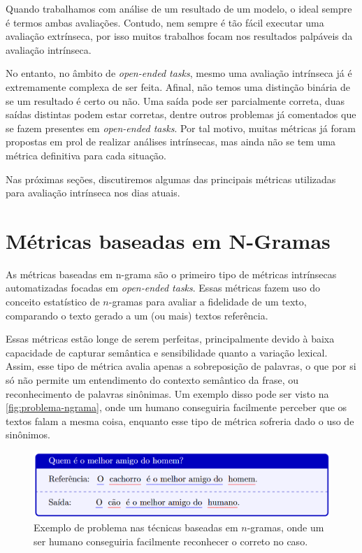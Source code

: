\documentclass[cic,tc]{iiufrgs}
\begin{document}
Quando trabalhamos com análise de um resultado de um modelo, o ideal sempre é termos ambas avaliações. Contudo, nem sempre é tão fácil executar uma avaliação extrínseca, por isso muitos trabalhos focam nos resultados palpáveis da avaliação intrínseca. 

No entanto, no âmbito de \textit{open-ended tasks}, mesmo uma avaliação intrínseca já é extremamente complexa de ser feita. Afinal, não temos uma distinção binária de se um resultado é certo ou não. Uma saída pode ser parcialmente correta, duas saídas distintas podem estar corretas, dentre outros problemas já comentados que se fazem presentes em \textit{open-ended tasks}. Por tal motivo, muitas métricas já foram propostas em prol de realizar análises intrínsecas, mas ainda não se tem uma métrica definitiva para cada situação.

Nas próximas seções, discutiremos algumas das principais métricas utilizadas para avaliação intrínseca nos dias atuais.

\section{Métricas baseadas em N-Gramas}
\label{sec:métricas baseadas em n-gramas}
As métricas baseadas em n-grama são o primeiro tipo de métricas intrínsecas automatizadas focadas em \textit{open-ended tasks}. Essas métricas fazem uso do conceito estatístico de $n$-gramas \cite{shannon1948mathematical} para avaliar a fidelidade de um texto, comparando o texto gerado a um (ou mais) textos referência.

Essas métricas estão longe de serem perfeitas, principalmente devido à baixa capacidade de capturar semântica e sensibilidade quanto a variação lexical. Assim, esse tipo de métrica avalia apenas a sobreposição de palavras, o que por si só não permite um entendimento do contexto semântico da frase, ou reconhecimento de palavras sinônimas. 
Um exemplo disso pode ser visto na \autoref{fig:problema-ngrama}, onde um humano conseguiria facilmente perceber que os textos falam a mesma coisa, enquanto esse tipo de métrica sofreria dado o uso de sinônimos.

\begin{figure}[htbp]
    \caption{Exemplo de problema nas técnicas baseadas em $n$-gramas, onde um ser humano conseguiria facilmente reconhecer o correto no caso.}
    \begin{center}
    \includegraphics[width=\textwidth]{Figures/sinonimos-problema.png}
    \end{center}
    \label{fig:problema-ngrama}
\end{figure}
\end{document}
